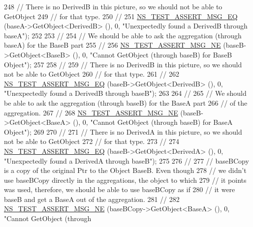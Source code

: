 \begin{DoxyCode}
248   \textcolor{comment}{// There is no DerivedB in this picture, so we should not be able to GetObject}
249   \textcolor{comment}{// for that type.}
250   \textcolor{comment}{//}
251   \hyperlink{group__testing_ga2a9d78cffb3db8e867c35fff0b698cf5}{NS\_TEST\_ASSERT\_MSG\_EQ} (baseA->GetObject<DerivedB> (), 0, \textcolor{stringliteral}{"Unexpectedly found a
       DerivedB through baseA"});
252 
253   \textcolor{comment}{//}
254   \textcolor{comment}{// We should be able to ask the aggregation (through baseA) for the BaseB part}
255   \textcolor{comment}{//}
256   \hyperlink{group__testing_ga73d66fb0050a5111453fd144e767b91a}{NS\_TEST\_ASSERT\_MSG\_NE} (baseB->GetObject<BaseB> (), 0, \textcolor{stringliteral}{"Cannot GetObject (through
       baseB) for BaseB Object"});
257 
258   \textcolor{comment}{//}
259   \textcolor{comment}{// There is no DerivedB in this picture, so we should not be able to GetObject}
260   \textcolor{comment}{// for that type.}
261   \textcolor{comment}{//}
262   \hyperlink{group__testing_ga2a9d78cffb3db8e867c35fff0b698cf5}{NS\_TEST\_ASSERT\_MSG\_EQ} (baseB->GetObject<DerivedB> (), 0, \textcolor{stringliteral}{"Unexpectedly found a
       DerivedB through baseB"});
263 
264   \textcolor{comment}{//}
265   \textcolor{comment}{// We should be able to ask the aggregation (through baseB) for the BaseA part}
266   \textcolor{comment}{// of the aggregation.}
267   \textcolor{comment}{//}
268   \hyperlink{group__testing_ga73d66fb0050a5111453fd144e767b91a}{NS\_TEST\_ASSERT\_MSG\_NE} (baseB->GetObject<BaseA> (), 0, \textcolor{stringliteral}{"Cannot GetObject (through
       baseB) for BaseA Object"});
269 
270   \textcolor{comment}{//}
271   \textcolor{comment}{// There is no DerivedA in this picture, so we should not be able to GetObject}
272   \textcolor{comment}{// for that type.}
273   \textcolor{comment}{//}
274   \hyperlink{group__testing_ga2a9d78cffb3db8e867c35fff0b698cf5}{NS\_TEST\_ASSERT\_MSG\_EQ} (baseB->GetObject<DerivedA> (), 0, \textcolor{stringliteral}{"Unexpectedly found a
       DerivedA through baseB"});
275 
276   \textcolor{comment}{//}
277   \textcolor{comment}{// baseBCopy is a copy of the original Ptr to the Object BaseB.  Even though}
278   \textcolor{comment}{// we didn't use baseBCopy directly in the aggregations, the object to which}
279   \textcolor{comment}{// it points was used, therefore, we should be able to use baseBCopy as if}
280   \textcolor{comment}{// it were baseB and get a BaseA out of the aggregation.}
281   \textcolor{comment}{//}
282   \hyperlink{group__testing_ga73d66fb0050a5111453fd144e767b91a}{NS\_TEST\_ASSERT\_MSG\_NE} (baseBCopy->GetObject<BaseA> (), 0, \textcolor{stringliteral}{"Cannot GetObject (through
}
\end{DoxyCode}
